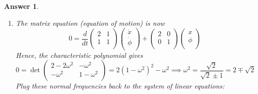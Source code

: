 \documentclass[a4paper]{article}
\newtheorem{ans}{Answer}[section]
\theoremstyle{new}
\begin{document}
\begin{ans}
\begin{enumerate}[label=(\alph*)]
\begin{enumerate}[label=(\roman*)]
\begin{align}
\end{align}
The corresponding equations of motion (use Euler-Lagrange equations to extremize the Lagrangian) is a system of ODE:
\begin{align}
0&=\frac{d}{dt}\frac{\partial\mathcal{L}}{\partial\dot{q}}-\frac{\partial\mathcal{L}}{\partial\mathbf{q}}\nonumber\\&=\frac{d}{dt}\begin{pmatrix}m+M&ML\\ML&L^2\\\end{pmatrix}\begin{pmatrix}\dot{x}\\\dot{\phi}\\\end{pmatrix}+\begin{pmatrix}k&0\\0&MgL\\\end{pmatrix}\begin{pmatrix}x\\\phi\\\end{pmatrix}\nonumber
\end{align}
\item The matrix equation (equation of motion) is now
$$0=\frac{d}{dt}\begin{pmatrix}2&1\\1&1\\\end{pmatrix}\begin{pmatrix}\dot{x}\\\dot{\phi}\\\end{pmatrix}+\begin{pmatrix}2&0\\0&1\\\end{pmatrix}\begin{pmatrix}x\\\phi\\\end{pmatrix}$$
Hence, the characteristic polynomial gives
$$0=\det\begin{pmatrix}2-2\omega^2&-\omega^2\\-\omega^2&1-\omega^2\\\end{pmatrix}=2(1-\omega^2)^2-\omega^2\implies\omega^2=\frac{\sqrt{2}}{\sqrt{2}\pm 1}=2\mp\sqrt{2}$$
Plug these normal frequencies back to the system of linear equations:

\end{enumerate}
\end{enumerate}
\end{ans}
\end{document}
